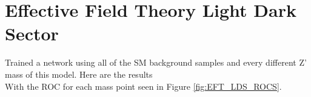 \documentclass[14pt, a4paper]{book}
\begin{document}
\newpage
\section{Effective Field Theory Light Dark Sector}
Trained a network using all of the SM background samples and every different Z' mass of this model. Here are the results
\\With the ROC for each mass point seen in Figure \ref{fig:EFT_LDS_ROCS}.
\end{document}
